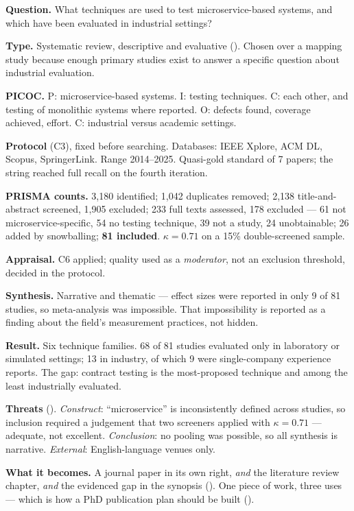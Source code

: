\begin{vignette}
\textbf{Question.} What techniques are used to test microservice-based systems,
and which have been evaluated in industrial settings?

\medskip
\textbf{Type.} Systematic review, descriptive and evaluative
(). Chosen over a mapping study because enough primary studies
exist to answer a specific question about industrial evaluation.

\medskip
\textbf{PICOC.} P: microservice-based systems. I: testing techniques.
C: each other, and testing of monolithic systems where reported. O: defects
found, coverage achieved, effort. C: industrial versus academic settings.

\medskip
\textbf{Protocol} (C3), fixed before searching. Databases: IEEE Xplore, ACM DL,
Scopus, SpringerLink. Range 2014--2025. Quasi-gold standard of 7 papers;
the string reached full recall on the fourth iteration.

\medskip
\textbf{PRISMA counts.} 3,180 identified; 1,042 duplicates removed; 2,138
title-and-abstract screened, 1,905 excluded; 233 full texts assessed, 178
excluded --- 61 not microservice-specific, 54 no testing technique, 39 not a
study, 24 unobtainable; 26 added by snowballing; \textbf{81 included}.
$\kappa = 0.71$ on a 15\% double-screened sample.

\medskip
\textbf{Appraisal.} C6 applied; quality used as a \emph{moderator}, not an
exclusion threshold, decided in the protocol.

\medskip
\textbf{Synthesis.} Narrative and thematic --- effect sizes were reported in
only 9 of 81 studies, so meta-analysis was impossible. That impossibility is
reported as a finding about the field's measurement practices, not hidden.

\medskip
\textbf{Result.} Six technique families. 68 of 81 studies evaluated only in
laboratory or simulated settings; 13 in industry, of which 9 were single-company
experience reports. The gap: contract testing is the most-proposed technique
and among the least industrially evaluated.

\medskip
\textbf{Threats} (). \emph{Construct}: ``microservice'' is
inconsistently defined across studies, so inclusion required a judgement that
two screeners applied with $\kappa = 0.71$ --- adequate, not excellent.
\emph{Conclusion}: no pooling was possible, so all synthesis is narrative.
\emph{External}: English-language venues only.

\medskip
\textbf{What it becomes.} A journal paper in its own right, \emph{and} the
literature review chapter, \emph{and} the evidenced gap in the synopsis
(). One piece of work, three uses --- which is how a PhD
publication plan should be built ().
\end{vignette}

